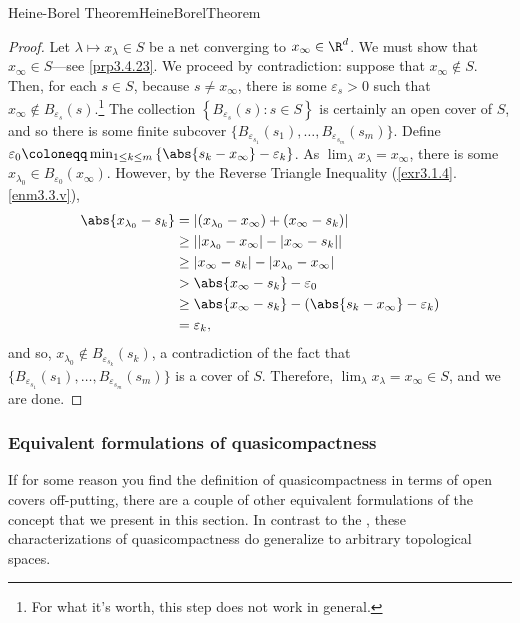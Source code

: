 \begin{thm}{Heine-Borel Theorem}{HeineBorelTheorem}
\begin{proof}
Let $\lambda \mapsto x_\lambda \in S$ be a net converging to $x_\infty \in \R ^d$.  We must show that $x_\infty \in S$---see \cref{prp3.4.23}.  We proceed by contradiction:  suppose that $x_\infty \notin S$.  Then, for each $s\in S$, because $s\neq x_\infty$, there is some $\varepsilon _s>0$ such that $x_\infty \notin B_{\varepsilon _s}(s)$.\footnote{For what it's worth, this step does not work in general.}  The collection $\left\{ B_{\varepsilon _s}(s):s\in S\right\}$ is certainly an open cover of $S$, and so there is some finite subcover $\{ B_{\varepsilon _{s_1}}(s_1),\ldots ,B_{\varepsilon _{s_m}}(s_m)\}$.  Define $\varepsilon _0\coloneqq \min _{1\leq k\leq m}\left\{ \abs{s_k-x_\infty}-\varepsilon _k\right\}$.  As $\lim _{\lambda}x_{\lambda}=x_{\infty}$, there is some $x_{\lambda _0}\in B_{\varepsilon _0}(x_\infty)$.  However, by the Reverse Triangle Inequality (\cref{exr3.1.4}.\cref{enm3.3.v}),
\begin{equation}
\begin{split}
\abs{x_{\lambda _0}-s_k} & =\left| (x_{\lambda _0}-x_\infty )+(x_\infty -s_k)\right| \\
& \geq \left| \left| x_{\lambda _0}-x_\infty \right| -\left| x_\infty -s_k\right| \right| \\
& \geq \left| x_\infty -s_k\right| -\left| x_{\lambda _0}-x_\infty \right| \\
& >\abs{x_{\infty}-s_k}-\varepsilon _0 \\
& \geq \abs{x_{\infty}-s_k}-\left( \abs{s_k-x_{\infty}}-\varepsilon _k\right) \\
& =\varepsilon _k,
\end{split}
\end{equation}
and so, $x_{\lambda _0}\notin B_{\varepsilon _{s_k}}(s_k)$, a contradiction of the fact that $\{ B_{\varepsilon _{s_1}}(s_1),\ldots ,B_{\varepsilon _{s_m}}(s_m)\}$ is a cover of $S$.  Therefore, $\lim _\lambda x_\lambda =x_\infty \in S$, and we are done.
\end{proof}
\end{thm}

\subsubsection{Equivalent formulations of quasicompactness}

If for some reason you find the definition of quasicompactness in terms of open covers off-putting, there are a couple of other equivalent formulations of the concept that we present in this section.  In contrast to the , these characterizations of quasicompactness do generalize to arbitrary topological spaces.

